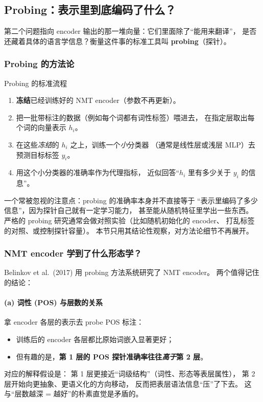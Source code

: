 \subsection{Probing：表示里到底编码了什么？}
\label{sec:probing}

第二个问题指向 encoder 输出的那一堆向量：它们里面除了“能用来翻译”，
是否还藏着具体的语言学信息？衡量这件事的标准工具叫 \textbf{probing}（探针）。

\subsubsection{Probing 的方法论}

\begin{mathbox}{Probing 的标准流程}
\begin{enumerate}
  \item \textbf{冻结}已经训练好的 NMT encoder（参数不再更新）。
  \item 把一批带标注的数据（例如每个词都有词性标签）喂进去，
        在指定层取出每个词的向量表示 \(h_i\)。
  \item 在这些\emph{冻结}的 \(h_i\) 之上，训练一个\emph{小}分类器
        （通常是线性层或浅层 MLP）去预测目标标签 \(y_i\)。
  \item 用这个小分类器的准确率作为代理指标，
        近似回答“\(h_i\) 里有多少关于 \(y_i\) 的信息”。
\end{enumerate}
\end{mathbox}

\begin{remark}
一个常被忽视的注意点：probing 的准确率本身并不直接等于
“表示里编码了多少信息”，因为探针自己就有一定学习能力，
甚至能从随机特征里学出一些东西。
严格的 probing 研究通常会做对照实验（比如随机初始化的 encoder、
打乱标签的对照、或控制探针容量）。
本节只用其结论性观察，对方法论细节不再展开。
\end{remark}

\subsubsection{NMT encoder 学到了什么形态学？}

Belinkov et al.\ (2017) 用 probing 方法系统研究了 NMT encoder。
两个值得记住的结论：

\paragraph{(a) 词性 (POS) 与层数的关系}
拿 encoder 各层的表示去 probe POS 标注：
\begin{itemize}
  \item 训练后的 encoder 各层都比原始词嵌入显著更好；
  \item 但有趣的是，\textbf{第 1 层的 POS 探针准确率往往\emph{高于}第 2 层}。
\end{itemize}
对应的解释假设是：
第 1 层更接近“词级结构”（词性、形态等表层属性），
第 2 层开始向更抽象、更语义化的方向移动，
反而把表层语法信息“压”了下去。
这与“层数越深 = 越好”的朴素直觉是矛盾的。

